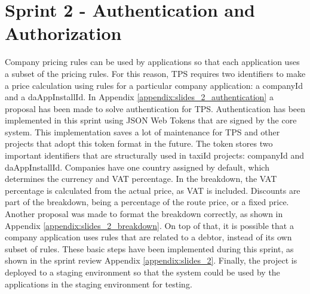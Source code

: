 \section{Sprint 2 - Authentication and Authorization}
Company pricing rules can be used by applications so that each application uses a subset of the pricing rules. For this reason, TPS requires two identifiers to make a price calculation using rules for a particular company application: a companyId and a daAppInstallId. In Appendix \ref{appendix:slides_2_authentication} a proposal has been made to solve authentication for TPS. Authentication has been implemented in this sprint using JSON Web Tokens that are signed by the core system. This implementation saves a lot of maintenance for TPS and other projects that adopt this token format in the future. The token stores two important identifiers that are structurally used in taxiId projects: companyId and daAppInstallId. Companies have one country assigned by default, which determines the currency and VAT percentage. In the breakdown, the VAT percentage is calculated from the actual price, as VAT is included. Discounts are part of the breakdown, being a percentage of the route price, or a fixed price. Another proposal was made to format the breakdown correctly, as shown in Appendix \ref{appendix:slides_2_breakdown}. On top of that, it is possible that a company application uses rules that are related to a debtor, instead of its own subset of rules. These basic steps have been implemented during this sprint, as shown in the sprint review Appendix \ref{appendix:slides_2}. Finally, the project is deployed to a staging environment so that the system could be used by the applications in the staging environment for testing.

%
